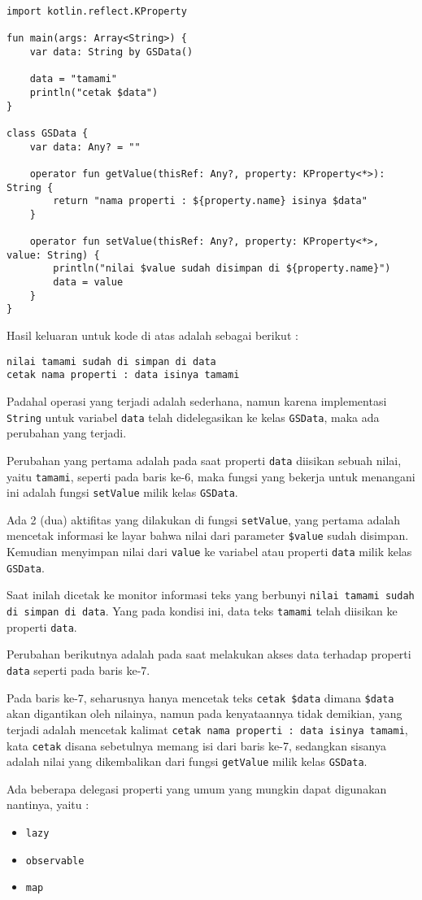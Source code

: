 \begin{lstlisting}
import kotlin.reflect.KProperty

fun main(args: Array<String>) {
	var data: String by GSData()
	
	data = "tamami"
	println("cetak $data")
}

class GSData {
	var data: Any? = ""

	operator fun getValue(thisRef: Any?, property: KProperty<*>): String {
		return "nama properti : ${property.name} isinya $data"
	}
	
	operator fun setValue(thisRef: Any?, property: KProperty<*>, value: String) {
		println("nilai $value sudah disimpan di ${property.name}")
		data = value
	}
}
\end{lstlisting}

Hasil keluaran untuk kode di atas adalah sebagai berikut :

\begin{lstlisting}
nilai tamami sudah di simpan di data
cetak nama properti : data isinya tamami
\end{lstlisting}

Padahal operasi yang terjadi adalah sederhana, namun karena implementasi \texttt{String} untuk variabel \texttt{data} telah didelegasikan ke kelas \texttt{GSData}, maka ada perubahan yang terjadi. 

Perubahan yang pertama adalah pada saat properti \texttt{data} diisikan sebuah nilai, yaitu \texttt{tamami}, seperti pada baris ke-6, maka fungsi yang bekerja untuk menangani ini adalah fungsi \texttt{setValue} milik kelas \texttt{GSData}.

Ada 2 (dua) aktifitas yang dilakukan di fungsi \texttt{setValue}, yang pertama adalah mencetak informasi ke layar bahwa nilai dari parameter \texttt{\$value} sudah disimpan. Kemudian menyimpan nilai dari \texttt{value} ke variabel atau properti \texttt{data} milik kelas \texttt{GSData}.

Saat inilah dicetak ke monitor informasi teks yang berbunyi \texttt{nilai tamami sudah di simpan di data}. Yang pada kondisi ini, data teks \texttt{tamami} telah diisikan ke properti \texttt{data}.

Perubahan berikutnya adalah pada saat melakukan akses data terhadap properti \texttt{data} seperti pada baris ke-7.

Pada baris ke-7, seharusnya hanya mencetak teks \texttt{cetak \$data} dimana \texttt{\$data} akan digantikan oleh nilainya, namun pada kenyataannya tidak demikian, yang terjadi adalah mencetak kalimat \texttt{cetak nama properti : data isinya tamami}, kata \texttt{cetak} disana sebetulnya memang isi dari baris ke-7, sedangkan sisanya adalah nilai yang dikembalikan dari fungsi \texttt{getValue} milik kelas \texttt{GSData}.

Ada beberapa delegasi properti yang umum yang mungkin dapat digunakan nantinya, yaitu :

\begin{itemize}
	\item \texttt{lazy}
	\item \texttt{observable}
	\item \texttt{map}
\end{itemize}